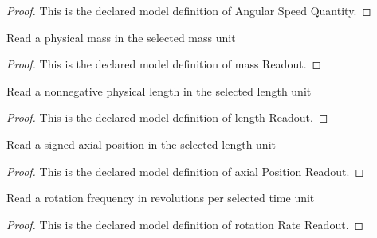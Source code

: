 \begin{proof}
  This is the declared model definition of Angular Speed Quantity.
\end{proof}
\begin{definition}
  \label{def:physics:phyx-mini-0696:phyxminiproblems-problemphyxmini0696-massreadout}
  Read a physical mass in the selected mass unit
\end{definition}
\begin{proof}
  This is the declared model definition of mass Readout.
\end{proof}
\begin{definition}
  \label{def:physics:phyx-mini-0696:phyxminiproblems-problemphyxmini0696-lengthreadout}
  Read a nonnegative physical length in the selected length unit
\end{definition}
\begin{proof}
  This is the declared model definition of length Readout.
\end{proof}
\begin{definition}
  \label{def:physics:phyx-mini-0696:phyxminiproblems-problemphyxmini0696-axialpositionreadout}
  Read a signed axial position in the selected length unit
\end{definition}
\begin{proof}
  This is the declared model definition of axial Position Readout.
\end{proof}
\begin{definition}
  \label{def:physics:phyx-mini-0696:phyxminiproblems-problemphyxmini0696-rotationratereadout}
  Read a rotation frequency in revolutions per selected time unit
\end{definition}
\begin{proof}
  This is the declared model definition of rotation Rate Readout.
\end{proof}
